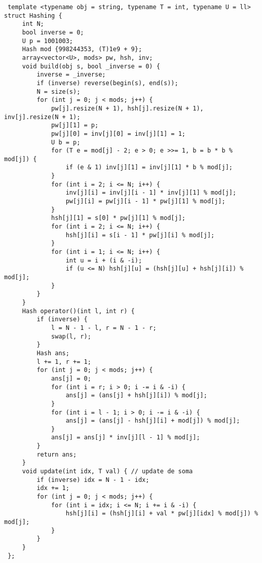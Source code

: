 \documentclass[11pt, a4paper, twoside]{article}
\begin{document}
\begin{lstlisting}
 template <typename obj = string, typename T = int, typename U = ll> struct Hashing {
     int N;
     bool inverse = 0;
     U p = 1001003;
     Hash mod {998244353, (T)1e9 + 9};
     array<vector<U>, mods> pw, hsh, inv;
     void build(obj s, bool _inverse = 0) {
         inverse = _inverse;
         if (inverse) reverse(begin(s), end(s));
         N = size(s);
         for (int j = 0; j < mods; j++) {
             pw[j].resize(N + 1), hsh[j].resize(N + 1), inv[j].resize(N + 1);
             pw[j][1] = p;
             pw[j][0] = inv[j][0] = inv[j][1] = 1;
             U b = p;
             for (T e = mod[j] - 2; e > 0; e >>= 1, b = b * b % mod[j]) {
                 if (e & 1) inv[j][1] = inv[j][1] * b % mod[j];
             }
             for (int i = 2; i <= N; i++) {
                 inv[j][i] = inv[j][i - 1] * inv[j][1] % mod[j];
                 pw[j][i] = pw[j][i - 1] * pw[j][1] % mod[j];
             }
             hsh[j][1] = s[0] * pw[j][1] % mod[j];
             for (int i = 2; i <= N; i++) {
                 hsh[j][i] = s[i - 1] * pw[j][i] % mod[j];
             }
             for (int i = 1; i <= N; i++) {
                 int u = i + (i & -i);
                 if (u <= N) hsh[j][u] = (hsh[j][u] + hsh[j][i]) % mod[j];
             }
         }
     }
     Hash operator()(int l, int r) {
         if (inverse) {
             l = N - 1 - l, r = N - 1 - r;
             swap(l, r);
         }
         Hash ans;
         l += 1, r += 1;
         for (int j = 0; j < mods; j++) {
             ans[j] = 0;
             for (int i = r; i > 0; i -= i & -i) {
                 ans[j] = (ans[j] + hsh[j][i]) % mod[j];
             }
             for (int i = l - 1; i > 0; i -= i & -i) {
                 ans[j] = (ans[j] - hsh[j][i] + mod[j]) % mod[j];
             }
             ans[j] = ans[j] * inv[j][l - 1] % mod[j];
         }
         return ans;
     }
     void update(int idx, T val) { // update de soma
         if (inverse) idx = N - 1 - idx;
         idx += 1;
         for (int j = 0; j < mods; j++) {
             for (int i = idx; i <= N; i += i & -i) {
                 hsh[j][i] = (hsh[j][i] + val * pw[j][idx] % mod[j]) % mod[j];
             }
         }
     }
 };
\end{lstlisting}
\end{document}
